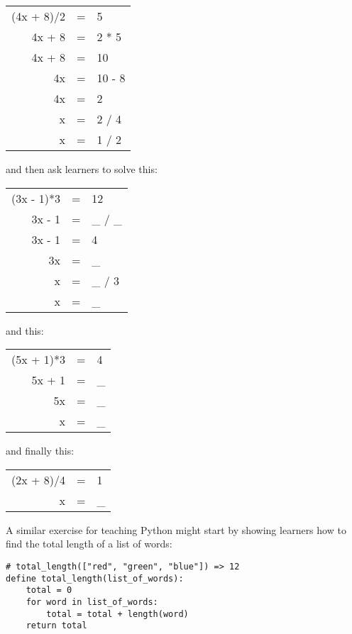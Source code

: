 \begin{center}
\begin{tabular}{rcl}
  (4x + 8)/2	& = &	5	\\
  4x + 8	& = &	2 * 5	\\
  4x + 8	& = &	10	\\
  4x		& = &	10 - 8	\\
  4x		& = &	2	\\
  x		& = &	2 / 4	\\
  x		& = &	1 / 2
\end{tabular}
\end{center}

\noindent
and then ask learners to solve this:

\begin{center}
\begin{tabular}{rcl}
  (3x - 1)*3	& = &	12	\\
  3x - 1	& = &	\_ / \_	\\
  3x - 1	& = &	4	\\
  3x		& = &	\_	\\
  x		& = &	\_ / 3	\\
  x		& = &	\_
\end{tabular}
\end{center}

\noindent
and this:

\begin{center}
\begin{tabular}{rcl}
  (5x + 1)*3	& = &	4	\\
  5x + 1	& = &	\_ 	\\
  5x		& = &	\_ 	\\
  x		& = &	\_
\end{tabular}
\end{center}

\noindent
and finally this:

\begin{center}
\begin{tabular}{rcl}
  (2x + 8)/4	& = &	1	\\
   x		& = &	\_
\end{tabular}
\end{center}

A similar exercise for teaching Python might start by showing learners
how to find the total length of a list of words:

\begin{verbatim}
# total_length(["red", "green", "blue"]) => 12
define total_length(list_of_words):
    total = 0
    for word in list_of_words:
        total = total + length(word)
    return total
\end{verbatim}

